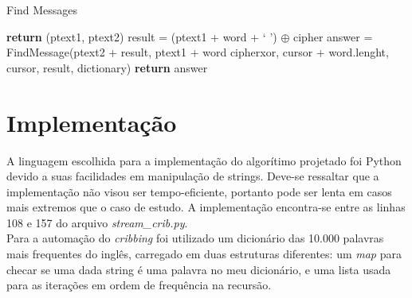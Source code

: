 \documentclass[10pt]{article}
\begin{document}
        
        \begin{algorithm}
            \caption{Find Messages}
            \begin{algorithmic}
                            \State \textbf{return} (ptext1, ptext2)
                        \EndIf
                    \Else
                            \State result = (ptext1 + word + ` ') $\oplus$ cipher
                                \State answer = FindMessage(ptext2 + result, ptext1 + word 
                                \State \hspace{3.6cm}cipherxor, cursor + word.lenght, cursor, result, dictionary)
                                    \State \textbf{return} answer
                                \EndIf
                            \EndIf
                        \EndFor
                    \EndIf
                \EndProcedure
            \end{algorithmic}
        \end{algorithm}
        


    \section{Implementação}
        A linguagem escolhida para a implementação do algorítimo projetado foi Python devido a suas facilidades em manipulação de strings. Deve-se ressaltar que a implementação não visou ser tempo-eficiente, portanto pode ser lenta em casos mais extremos que o caso de estudo. A implementação encontra-se entre as linhas 108 e 157 do arquivo \textit{stream\_crib.py}. \\

        Para a automação do \textit{cribbing} foi utilizado um dicionário das 10.000 palavras mais frequentes do inglês, carregado em duas estruturas diferentes: um \textit{map} para checar se uma dada string é uma palavra no meu dicionário, e uma lista usada para as iterações em ordem de frequência na recursão.\\
\end{document}
